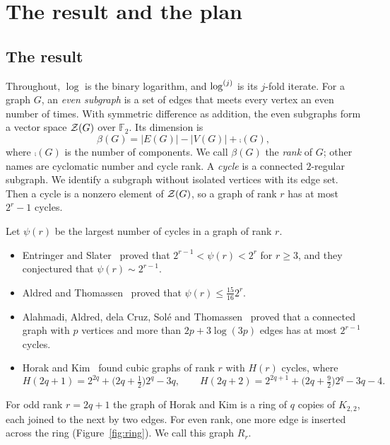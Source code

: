 \section{The result and the plan}\label{sec:intro}

\subsection{The result}

Throughout, $\log$ is the binary logarithm, and $\log^{(j)}$ is its $j$-fold iterate. For a graph
$G$, an \emph{even subgraph} is a set of edges that meets every vertex an even number of times.
With symmetric difference as addition, the even subgraphs form a vector space $\mathcal{Z}(G)$ over
$\mathbb{F}_2$. Its dimension is
\[
  \beta(G)=|E(G)|-|V(G)|+\comp(G),
\]
where $\comp(G)$ is the number of components. We call $\beta(G)$ the \emph{rank} of $G$; other
names are cyclomatic number and cycle rank. A \emph{cycle} is a connected $2$-regular subgraph. We
identify a subgraph without isolated vertices with its edge set. Then a cycle is a nonzero element
of $\mathcal{Z}(G)$, so a graph of rank $r$ has at most $2^{r}-1$ cycles.

Let $\psi(r)$ be the largest number of cycles in a graph of rank $r$.
\begin{itemize}[leftmargin=1.4em]
\item Entringer and Slater~\cite{ES} proved that $2^{r-1}<\psi(r)<2^{r}$ for $r\ge3$, and they
conjectured that $\psi(r)\sim2^{r-1}$.
\item Aldred and Thomassen~\cite{AT} proved that $\psi(r)\le\frac{15}{16}2^{r}$.
\item Alahmadi, Aldred, dela Cruz, Sol\'e and Thomassen~\cite{AACST} proved that a connected
graph with $p$ vertices and more than $2p+3\log(3p)$ edges has at most $2^{r-1}$ cycles.
\item Horak and Kim~\cite{HK} found cubic graphs of rank $r$ with $H(r)$ cycles, where
\begin{equation}\label{eq:H}
  H(2q+1)=2^{2q}+\bigl(2q+\tfrac12\bigr)2^{q}-3q,\qquad
  H(2q+2)=2^{2q+1}+\bigl(2q+\tfrac92\bigr)2^{q}-3q-4 .
\end{equation}
\end{itemize}
For odd rank $r=2q+1$ the graph of Horak and Kim is a ring of $q$ copies of $K_{2,2}$, each joined
to the next by two edges. For even rank, one more edge is inserted across the ring
(Figure~\ref{fig:ring}). We call this graph $R_r$.

